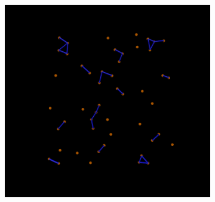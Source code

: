 \documentclass[../../main.tex]{subfiles}
\begin{document}

        \begin{figure}[h]
            \centering
            \begin{subfigure}[b]{0.475\textwidth}
                \centering
                \includegraphics[width=\textwidth]{Figures/begin_np.png}
                \caption{}
                \label{fig: initial condition}
            \end{subfigure}
            \hfill
            \begin{subfigure}[b]{0.475\textwidth}
                \centering

\end{subfigure}
\end{figure}
\end{document}
